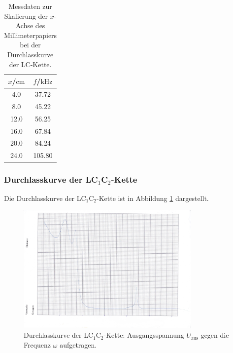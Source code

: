 \begin{table}
	\caption{Messdaten zur Skalierung der $x$-Achse des Millimeterpapiers bei der
	Durchlasskurve der LC-Kette.}
	\label{tab:skalaLC}
	\centering
	\begin{tabular}{cc}
		\toprule
		$x$/$\si{\centi\meter}$ & $f$/$\si{\kilo\hertz}$ \\
		\midrule
		4.0                     & 37.72                  \\
		8.0                     & 45.22                  \\
		12.0                    & 56.25                  \\
		16.0                    & 67.84                  \\
		20.0                    & 84.24                  \\
		24.0                    & 105.80                 \\
		\bottomrule
	\end{tabular}
\end{table}



\FloatBarrier
\subsubsection{Durchlasskurve der LC$_1$C$_2$-Kette}

Die Durchlasskurve der LC$_1$C$_2$-Kette ist in Abbildung \ref{fig:durchiLCC} dargestellt.

\begin{figure}
	\centering
	\includegraphics[width=0.8\textwidth]{Bilder/durchlasskurve_lc1c2.jpg}
	\caption{Durchlasskurve der LC$_1$C$_2$-Kette: Ausgangsspannung $U_{\text{aus}}$ gegen
		die Frequenz $\omega$ aufgetragen.}
	\label{fig:durchiLCC}
\end{figure}

